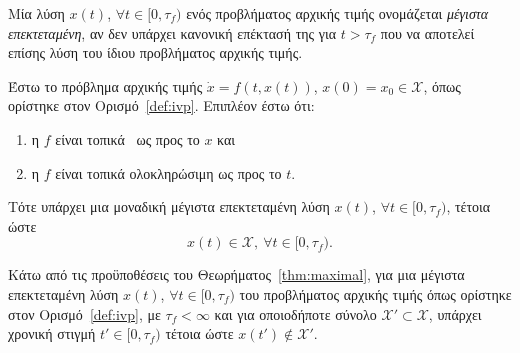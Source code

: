     \begin{definition}
        Μία λύση $x(t)$, $\forall t \in [0, \tau_f)$ ενός προβλήματος αρχικής τιμής ονομάζεται \emph{μέγιστα επεκτεταμένη}, αν δεν υπάρχει κανονική επέκτασή της για $t > \tau_f$ που να αποτελεί επίσης λύση του ίδιου προβλήματος αρχικής τιμής.
    \end{definition}

    \begin{theorem}
        \label{thm:maximal}
        Έστω το πρόβλημα αρχικής τιμής $\dot x = f(t, x(t))$, $x(0) = x_0 \in \mathcal X$, όπως ορίστηκε στον Ορισμό~\ref{def:ivp}. Επιπλέον έστω ότι:
        \begin{enumerate}
            \item η $f$ είναι τοπικά \lip\ ως προς το $x$ και 
            \item η $f$ είναι τοπικά ολοκληρώσιμη ως προς το $t$.
        \end{enumerate}
        Τότε υπάρχει μια μοναδική μέγιστα επεκτεταμένη λύση $x(t)$, $\forall t \in [0, \tau_f)$, τέτοια ώστε
        \[
            x(t) \in \mathcal X,\ \forall t  \in [0, \tau_f).
        \]
    \end{theorem}

    \begin{proposition}
        \label{thm:contr}
        Κάτω από τις προϋποθέσεις του Θεωρήματος~\ref{thm:maximal}, για μια μέγιστα επεκτεταμένη λύση $x(t)$, $\forall t \in [0, \tau_f)$ του προβλήματος αρχικής τιμής όπως ορίστηκε στον Ορισμό~\ref{def:ivp}, με $\tau_f < \infty$ και για οποιοδήποτε σύνολο $\mathcal X' \subset \mathcal X$, υπάρχει χρονική στιγμή $t' \in [0, \tau_f)$ τέτοια ώστε $x(t') \notin \mathcal X'$.
    \end{proposition}
